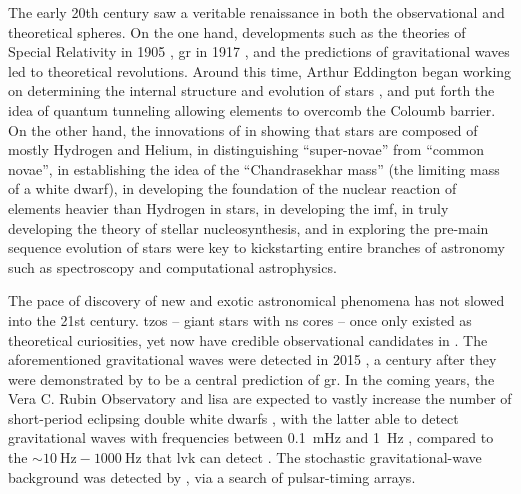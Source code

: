 The early 20th century saw a veritable renaissance in both the observational and theoretical spheres. On the one hand, developments such as the theories of Special Relativity in 1905 \citep{Einstein:1905}, \gls{gr} in 1917 \citep{Einstein:1917}, and the predictions of gravitational waves \citep{Poincare:1906, Einstein:1916} led to theoretical revolutions. Around this time, Arthur Eddington began working on determining the internal structure and evolution of stars \citep{Eddington:1916, Eddington:1920}, and \citet{Gamow:1928} put forth the idea of quantum tunneling allowing elements to overcomb the Coloumb barrier. On the other hand, the innovations of \citet{Payne:1925} in showing that stars are composed of mostly Hydrogen and Helium, \citet{Baade:1934} in distinguishing ``super-novae'' from ``common novae'', \citet{Chandrasekhar:1935} in establishing the idea of the ``Chandrasekhar mass'' (the limiting mass of a white dwarf), \citet{Hoyle:1946} in developing the foundation of the nuclear reaction of elements heavier than Hydrogen in stars, \citet{Salpeter:1955} in developing the \gls{imf}, \citet{Burbidge:1957} in truly developing the theory of stellar nucleosynthesis, \citet{Henyey:1955} and \citet{Hayashi:1961} in exploring the pre-main sequence evolution of stars were key to kickstarting entire branches of astronomy such as spectroscopy and computational astrophysics.

The pace of discovery of new and exotic astronomical phenomena has not slowed into the 21st century. \glspl{tzo} -- giant stars with \gls{ns} cores \citep{Thorne:1977} -- once only existed as theoretical curiosities, yet now have credible observational candidates in \citet{Levesque:2014}. The aforementioned gravitational waves were detected in 2015  \citep{Ligo_scientific_collaboration_and_virgo_collaboration:2016}, a century after they were demonstrated by \citet{Einstein:1916} to be a central prediction of \gls{gr}. In the coming years, the Vera C. Rubin Observatory \citep{Ivezic:2019} and \gls{lisa} are expected to vastly increase the number of short-period eclipsing double white dwarfs \citep{Burdge:2020}, with the latter able to detect gravitational waves with frequencies between \SI{0.1}{\milli\hertz} and \SI{1}{\hertz} \citep{Amaro-seoane:2012}, compared to the $\sim \SI{10}{\hertz}-\SI{1000}{\hertz}$ that \gls{lvk} can detect \citep{Schmitz:2021}. The stochastic gravitational-wave background was detected by \citet{Agazie:2023, Antoniadis:2023, Reardon:2023, Xu:2023}, via a search of pulsar-timing arrays.

